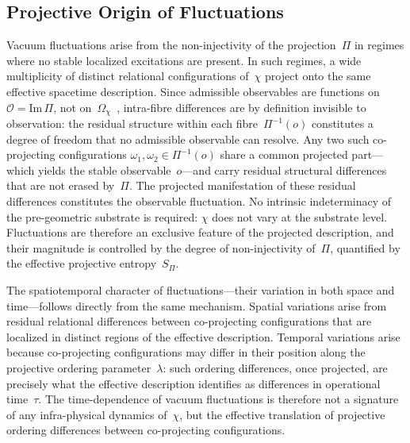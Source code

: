 \subsection{Projective Origin of Fluctuations}
  \label{subsec:projective-origin-of-fluctuations}

  Vacuum fluctuations arise from the non-injectivity of the projection~$\Pi$ in
  regimes where no stable localized excitations are present.
  In such regimes, a wide multiplicity of distinct relational configurations of~$\chi$
  project onto the same effective spacetime description.
  Since admissible observables are functions on $\mathcal{O} = \mathrm{Im}\,\Pi$,
  not on~$\Omega_\chi$~\cite{Beau2026m,Beau2026l}, intra-fibre differences are by
  definition invisible to observation: the residual structure within each
  fibre~$\Pi^{-1}(o)$ constitutes a degree of freedom that no admissible observable
  can resolve.
  Any two such co-projecting configurations $\omega_1, \omega_2 \in \Pi^{-1}(o)$
  share a common projected part---which yields the stable observable~$o$---and carry
  residual structural differences that are not erased by~$\Pi$.
  The projected manifestation of these residual differences constitutes the observable fluctuation.
  No intrinsic indeterminacy of the pre-geometric substrate is required: $\chi$ does not
  vary at the substrate level.
  Fluctuations are therefore an exclusive feature of the projected description, and their
  magnitude is controlled by the degree of non-injectivity of~$\Pi$, quantified by the
  effective projective entropy~$S_\Pi$.

  The spatiotemporal character of fluctuations---their variation in both space and
  time---follows directly from the same mechanism.
  Spatial variations arise from residual relational differences between co-projecting
  configurations that are localized in distinct regions of the effective description.
  Temporal variations arise because co-projecting configurations may differ in their
  position along the projective ordering parameter~$\lambda$: such ordering differences,
  once projected, are precisely what the effective description identifies as differences
  in operational time~$\tau$.
  The time-dependence of vacuum fluctuations is therefore not a signature of any
  infra-physical dynamics of~$\chi$, but the effective translation of projective ordering
  differences between co-projecting configurations.


